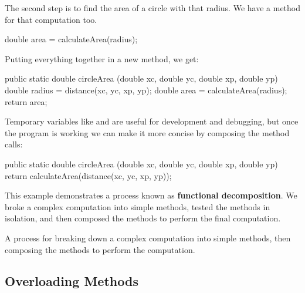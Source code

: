 The second step is to find the area of a circle with that radius.
We have a method for that computation too.

\begin{code}
double area = calculateArea(radius);
\end{code}

Putting everything together in a new method, we get:

\begin{code}
public static double circleArea
        (double xc, double yc, double xp, double yp) {
    double radius = distance(xc, yc, xp, yp);
    double area = calculateArea(radius);
    return area;
}
\end{code}

Temporary variables like  and  are useful for development and debugging, but once the program is working we can make it more concise by composing the method calls:

\begin{code}
public static double circleArea
        (double xc, double yc, double xp, double yp) {
    return calculateArea(distance(xc, yc, xp, yp));
}
\end{code}


This example demonstrates a process known as {\bf functional decomposition}.
We broke a complex computation into simple methods, tested the methods in isolation, and then composed the methods to perform the final computation.



\begin{description}

A process for breaking down a complex computation into simple methods, then composing the methods to perform the computation.

\end{description}


\subsection*{Overloading Methods}

